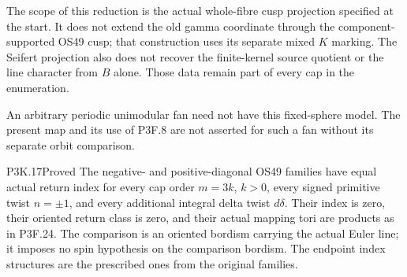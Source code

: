The scope of this reduction is the actual whole-fibre cusp
projection specified at the start.  It does not extend the old
gamma coordinate through the component-supported OS49 cusp;
that construction uses its separate mixed \(K\) marking.
The Seifert projection also does not recover the finite-kernel
source quotient or the line character from \(B\) alone.
Those data remain part of every cap in the enumeration.

An arbitrary periodic unimodular fan need not have this fixed-sphere
model.  The present map and its use of P3F.8 are not asserted for
such a fan without its separate orbit comparison.

\begin{statement}{P3K.17}{Proved}
The negative- and positive-diagonal OS49 families have equal
actual return index for every cap order \(m=3k\),
\(k>0\), every signed primitive twist \(n=\pm1\),
and every additional integral delta twist \(d\delta\).
Their index is zero, their oriented return class is zero, and
their actual mapping tori are products as in P3F.24.
The comparison is an oriented bordism carrying the actual
Euler line; it imposes no spin hypothesis on the comparison
bordism.  The endpoint index structures are the prescribed
ones from the original families.
\end{statement}

